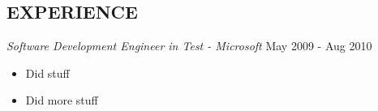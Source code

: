 \documentclass[line,margin]{res}
\begin{document}
\address{anorwell@gmail.com}
\address{647-987-3081}

 
\begin{resume}

\section{EXPERIENCE}

{\sl Software Development Engineer in Test - Microsoft} \hfill May 2009 - Aug 2010 \\
                 \begin{itemize}  \itemsep -2pt %
                 \item Did stuff\item Did more stuff
                \end{itemize}
    

\end{resume}
\end{document}
